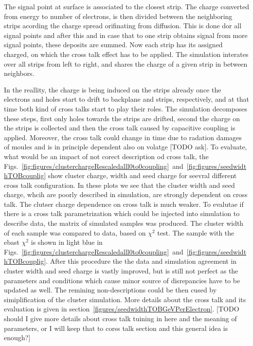 The signal point at surface is associated to the closest strip. The charge converted from energy to number of electrons, is then divided between the neighboring strips acording the charge spread orifinating from diffusion. This is done dor all signal points and after this and in case that to one strip obtains signal from more signal points, these deposits are summed. Now each strip has its assigned charged, on which the cross talk effect has to be applied. The simulation interates over all strips from left to right, and shares the charge of a given strip in between neighbors.

In the reallity, the charge is being induced on the strips already once the electrons and holes start to drift to backplane and strips, respectively, and at that time both kind of cross talks start to play their roles. The simulation decomposes these steps, first only holes towards the strips are drifted, second the charge on the strips is collected and then the cross talk caused by capacitive coupling is applied. Moreover, the cross talk could change in time due to radation damages of moules and is in principle dependent also on volatge [TODO ask]. To evaluate, what would be an impact of not corect description od cross talk, the Figs.~\ref{fig:figures/clusterchargeRescaledalll0to0coupling}~and~\ref{fig:figures/seedwidthTOBcouplig} show cluster charge, width and seed charge for seevral different cross talk configuration. In these plots we see that the cluster width and seed charge, whcih are poorly described in simulation, are strongly dependent on cross talk. The clutser charge dependence on cross talk is much weaker. To evalutae if there is a cross talk parametrization which could be injected into simulation to describe data, the matrix of simulated samples was produced. The cluster width of each sample was compared to data, based on $\chi^{2}$ test. The sample with the ebast $\chi^{2}$ is shown in light blue in Figs.~\ref{fig:figures/clusterchargeRescaledalll0to0coupling}~and~\ref{fig:figures/seedwidthTOBcouplig}. After this procedure the the data and simulation agreement in cluster width and seed charge is vastly improved, but is still not perfect as the parameters and conditions which cause minor source of disrepancies have to be updated as well. The remining non-descriptions could be then cused by simiplification of the cluster simulation. More details about the cross talk and its evaluation is given in section~\ref{figures/seedwidthTOBGeVPerElectron}. [TODO should I give more details about cross talk tuining in here and the meaning of parameters, or I will keep that to corss talk section and this general idea is enough?]


